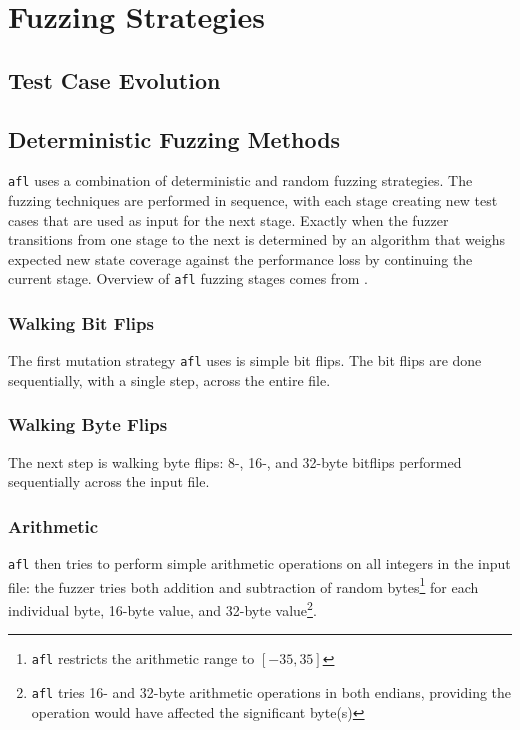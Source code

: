 
\section{Fuzzing Strategies}


\subsection{Test Case Evolution}

\subsection{Deterministic Fuzzing Methods}

\texttt{afl} uses a combination of deterministic and random fuzzing strategies.
The fuzzing techniques are performed in sequence, with each stage
creating new test cases that are used as input for the next stage. Exactly
when the fuzzer transitions from one stage to the next is determined by an
algorithm that weighs expected new state coverage against the performance
loss by continuing the current stage. Overview of \texttt{afl} fuzzing
stages comes from \cite{afl-fuzzing-blogpost}.

\subsubsection{Walking Bit Flips}

The first mutation strategy \texttt{afl} uses is simple bit flips. The bit
flips are done sequentially, with a single step, across the entire file.

\subsubsection{Walking Byte Flips}

The next step is walking byte flips: 8-, 16-, and 32-byte bitflips performed
sequentially across the input file.

\subsubsection{Arithmetic}

\texttt{afl} then tries to perform simple arithmetic operations
on all integers in the input file: the fuzzer tries both addition and
subtraction of random bytes\footnote{\texttt{afl} restricts the arithmetic range to $[-35, 35]$\cite{afl-whitepaper}} for each
individual byte, 16-byte value, and 32-byte value\footnote{\texttt{afl} tries 16- and 32-byte arithmetic operations in both endians, providing the operation would have affected the significant byte(s)\cite{afl-whitepaper}}.

